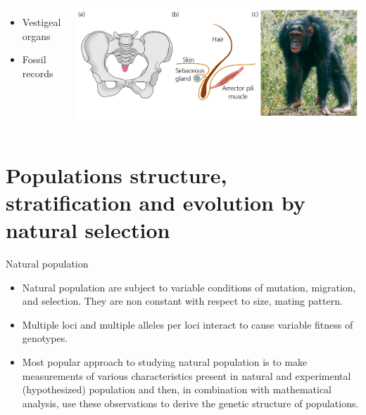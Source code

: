 \documentclass[11pt,dvipsnames,ignorenonframetext,aspectratio=169]{beamer}
\providecommand{\tightlist}{%
  \setlength{\itemsep}{0pt}\setlength{\parskip}{0pt}}
\begin{document}
\begin{frame}{}
\protect\hypertarget{section-4}{}
\begin{columns}


\begin{itemize}
\item Vestigeal organs
\item Fossil records
\end{itemize}



\includegraphics[width=0.95\linewidth]{../images/vestigeal_traits_coccyx_arrector_pili} 

\end{columns}
\end{frame}

\hypertarget{populations-structure-stratification-and-evolution-by-natural-selection}{%
\section{Populations structure, stratification and evolution by natural
selection}\label{populations-structure-stratification-and-evolution-by-natural-selection}}

\begin{frame}{Natural population}
\protect\hypertarget{natural-population}{}
\begin{itemize}
\tightlist
\item
  Natural population are subject to variable conditions of mutation,
  migration, and selection. They are non constant with respect to size,
  mating pattern.
\item
  Multiple loci and multiple alleles per loci interact to cause variable
  fitness of genotypes.
\item
  Most popular approach to studying natural population is to make
  measurements of various characteristics present in natural and
  experimental (hypothesized) population and then, in combination with
  mathematical analysis, use these observations to derive the genetic
  structure of populations.
\end{itemize}
\end{frame}
\end{document}
